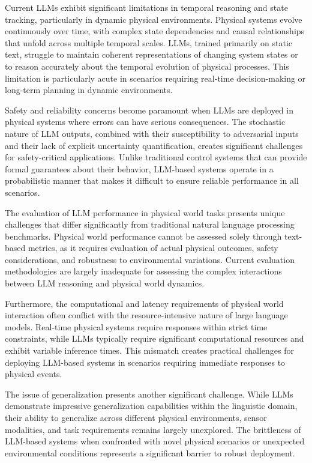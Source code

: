 Current LLMs exhibit significant limitations in temporal reasoning and state tracking, particularly in dynamic physical environments. Physical systems evolve continuously over time, with complex state dependencies and causal relationships that unfold across multiple temporal scales. LLMs, trained primarily on static text, struggle to maintain coherent representations of changing system states or to reason accurately about the temporal evolution of physical processes. This limitation is particularly acute in scenarios requiring real-time decision-making or long-term planning in dynamic environments.

Safety and reliability concerns become paramount when LLMs are deployed in physical systems where errors can have serious consequences. The stochastic nature of LLM outputs, combined with their susceptibility to adversarial inputs and their lack of explicit uncertainty quantification, creates significant challenges for safety-critical applications. Unlike traditional control systems that can provide formal guarantees about their behavior, LLM-based systems operate in a probabilistic manner that makes it difficult to ensure reliable performance in all scenarios.

The evaluation of LLM performance in physical world tasks presents unique challenges that differ significantly from traditional natural language processing benchmarks. Physical world performance cannot be assessed solely through text-based metrics, as it requires evaluation of actual physical outcomes, safety considerations, and robustness to environmental variations. Current evaluation methodologies are largely inadequate for assessing the complex interactions between LLM reasoning and physical world dynamics.

Furthermore, the computational and latency requirements of physical world interaction often conflict with the resource-intensive nature of large language models. Real-time physical systems require responses within strict time constraints, while LLMs typically require significant computational resources and exhibit variable inference times. This mismatch creates practical challenges for deploying LLM-based systems in scenarios requiring immediate responses to physical events.

The issue of generalization presents another significant challenge. While LLMs demonstrate impressive generalization capabilities within the linguistic domain, their ability to generalize across different physical environments, sensor modalities, and task requirements remains largely unexplored. The brittleness of LLM-based systems when confronted with novel physical scenarios or unexpected environmental conditions represents a significant barrier to robust deployment.

